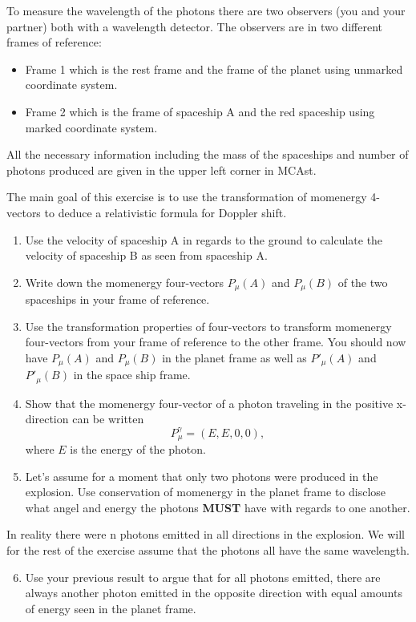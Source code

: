 {\begin{multicols}{2}
To measure the wavelength of the photons there are two observers (you and your partner) both with a wavelength detector. The observers are in two different frames of reference:
\begin{itemize}
\item Frame 1 which is the rest frame and the frame of the planet using unmarked coordinate system.
\item Frame 2 which is the frame of spaceship A and the red spaceship using marked coordinate system.
\end{itemize}

All the necessary information including the mass of the spaceships and number of photons produced are given in the upper left corner in MCAst.

The main goal of this exercise is to use the transformation of momenergy 4-vectors to deduce a relativistic formula for Doppler shift.

\begin{enumerate}
\item Use the velocity of spaceship A in regards to the ground to calculate the velocity of spaceship B as seen from spaceship A.
\item Write down the momenergy four-vectors $P_\mu(A)$ and $P_\mu(B)$ of the two spaceships in your frame of reference.
\item Use the transformation properties of four-vectors to transform momenergy four-vectors from your frame of reference to the other frame. You should now have $P_\mu(A)$ and $P_\mu(B)$ in the planet frame as well as $P'_\mu(A)$ and $P'_\mu(B)$ in the space ship frame.
\item Show that the momenergy four-vector of a photon traveling in the positive x-direction can be written
\[
P_\mu^\gamma=(E,E,0,0),
\]
where $E$ is the energy of the photon.

\item Let's assume for a moment that only two photons were produced in the explosion. Use conservation of momenergy in the planet frame to disclose what angel and energy the photons \textbf{MUST} have with regards to one another.
\end{enumerate}
In reality there were n photons emitted in all directions in the explosion. We will for the rest of the exercise assume that the photons all have the same wavelength. 
\begin{enumerate}
\setcounter{enumi}{5}
\item Use your previous result to argue that for all photons emitted, there are always another photon emitted in the opposite direction with equal amounts of energy seen in the planet frame.


\end{enumerate}
\end{multicols}}
